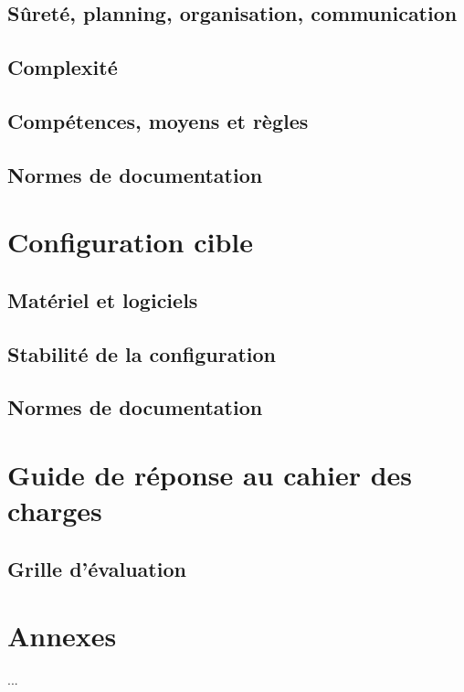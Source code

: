     \subsection{Sûreté, planning, organisation, communication}
    
    
    \subsection{Complexité}
    
    
    \subsection{Compétences, moyens et règles}
    
    
    \subsection{Normes de documentation}


\section{Configuration cible}

    \subsection{Matériel et logiciels}
    
    
    \subsection{Stabilité de la configuration}
    
    
    \subsection{Normes de documentation}


\section{Guide de réponse au cahier des charges}

    \subsection{Grille d'évaluation}


\section{Annexes}

    ...
